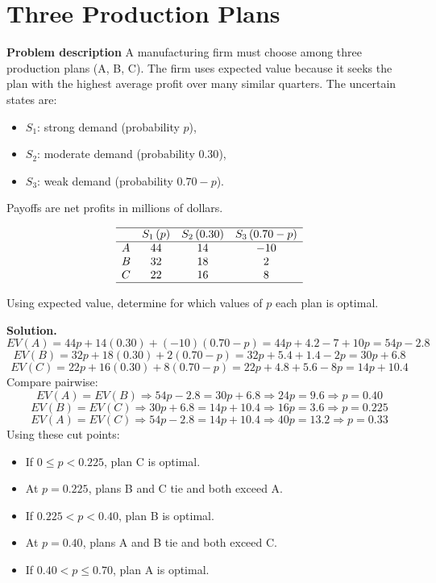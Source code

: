 \begin{ExamProblems}
		
		\hypertarget{c7-cu-ex4}{}
		\item
		\section{Three Production Plans}
		
		\textbf{Problem description}
		A manufacturing firm must choose among three production plans (A, B, C). The firm uses expected value because it seeks the plan with the highest average profit over many similar quarters. The uncertain states are:
		\begin{itemize}
			\item \(S_1\): strong demand (probability \(p\)),
			\item \(S_2\): moderate demand (probability \(0.30\)),
			\item \(S_3\): weak demand (probability \(0.70-p\)).
		\end{itemize}
		Payoffs are net profits in millions of dollars.
		
		\[
		\begin{array}{lccc}
			\hline
			& S_1\,(p) & S_2\,(0.30) & S_3\,(0.70-p) \\
			\hline
			A & 44 & 14 & -10 \\
			B & 32 & 18 & 2 \\
			C & 22 & 16 & 8 \\
			\hline
		\end{array}
		\]
		
		Using expected value, determine for which values of \(p\) each plan is optimal.
		
		\textbf{Solution.}
		\[
		EV(A)=44p+14(0.30)+(-10)(0.70-p)=44p+4.2-7+10p=54p-2.8
		\]
		\[
		EV(B)=32p+18(0.30)+2(0.70-p)=32p+5.4+1.4-2p=30p+6.8
		\]
		\[
		EV(C)=22p+16(0.30)+8(0.70-p)=22p+4.8+5.6-8p=14p+10.4
		\]
		Compare pairwise:
		\[
		EV(A)=EV(B)\Rightarrow 54p-2.8=30p+6.8\Rightarrow 24p=9.6\Rightarrow p=0.40
		\]
		\[
		EV(B)=EV(C)\Rightarrow 30p+6.8=14p+10.4\Rightarrow 16p=3.6\Rightarrow p=0.225
		\]
		\[
		EV(A)=EV(C)\Rightarrow 54p-2.8=14p+10.4\Rightarrow 40p=13.2\Rightarrow p=0.33
		\]
		Using these cut points:
		\begin{itemize}
			\item If \(0\le p<0.225\), plan C is optimal.
			\item At \(p=0.225\), plans B and C tie and both exceed A.
			\item If \(0.225<p<0.40\), plan B is optimal.
			\item At \(p=0.40\), plans A and B tie and both exceed C.
			\item If \(0.40<p\le0.70\), plan A is optimal.
		\end{itemize}
		

\end{ExamProblems}

